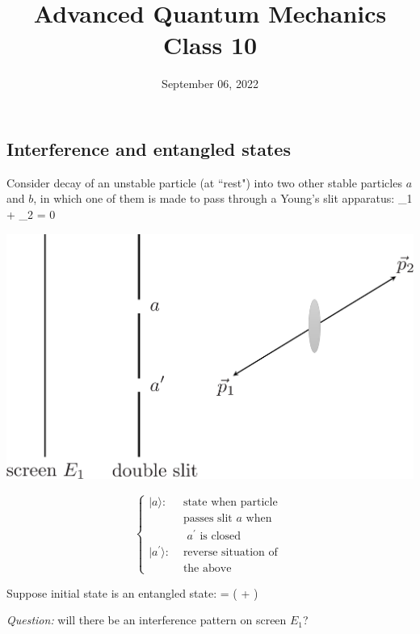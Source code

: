 \documentclass[12pt]{article}
\title{Advanced Quantum Mechanics\\Class 10}
\date{September 06, 2022}                                           %
\begin{document}
\maketitle

\subsection{Interference and entangled states}

Consider decay of an unstable particle (at
``rest") into two other stable particles $a$ and $b$, in which
one of them is made to pass through a Young's
slit apparatus:
\be
{}_1 + _2 = 0
\ee

\begin{minipage}{0.5\textwidth}
\includegraphics[width=\textwidth]{Figures/DoubleSlitEntangled.pdf}
\end{minipage}%
\begin{minipage}{0.5\textwidth}
\[
\left\{
\begin{aligned}
|a\rangle: & \text { state when particle } \\ 
& \text { passes slit $a$ when } \\ 
& \text { $a^{\prime}$ is closed } \\
|a^{\prime}\rangle:
& \text { reverse situation of } \\
& \text { the above } 
\end{aligned}
\right.
\]
\end{minipage}

Suppose initial state is an entangled state:
\be
\ket{\psi} = 
\left(
\otimes{} + \otimes{}
\right)
\ee

\emph{Question:} will there be an interference pattern
on screen \(E_{1}\)?
\end{document}
